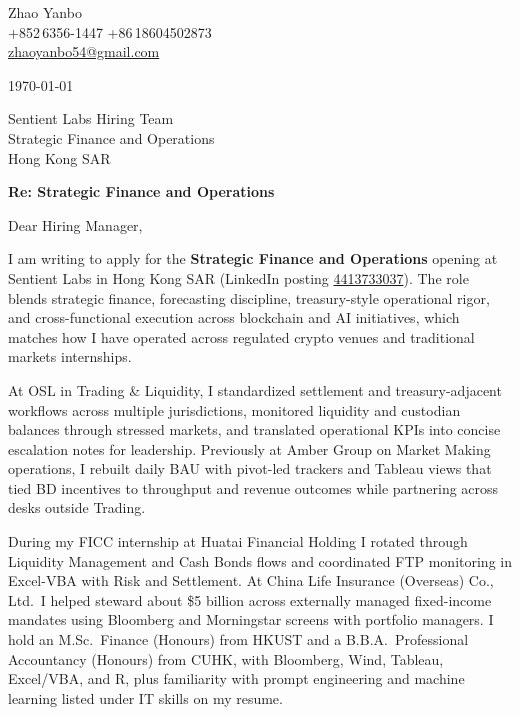 \documentclass[10pt,a4paper]{article}
\begin{document}
\begin{flushleft}
  Zhao Yanbo\\
  +852\,6356-1447 \;\textbar\; +86\,18604502873\\
  \href{mailto:zhaoyanbo54@gmail.com}{zhaoyanbo54@gmail.com}
\end{flushleft}

\vspace{1em}

\begin{flushright}
  \today
\end{flushright}

\vspace{0.75em}

Sentient Labs Hiring Team\\
Strategic Finance and Operations\\
Hong Kong SAR

\vspace{1em}

\textbf{Re: Strategic Finance and Operations}

\vspace{0.75em}

Dear Hiring Manager,

I am writing to apply for the \textbf{Strategic Finance and Operations} opening at Sentient Labs in Hong Kong SAR (LinkedIn posting \href{https://www.linkedin.com/jobs/view/4413733037/}{4413733037}). The role blends strategic finance, forecasting discipline, treasury-style operational rigor, and cross-functional execution across blockchain and AI initiatives, which matches how I have operated across regulated crypto venues and traditional markets internships.

At OSL in Trading \& Liquidity, I standardized settlement and treasury-adjacent workflows across multiple jurisdictions, monitored liquidity and custodian balances through stressed markets, and translated operational KPIs into concise escalation notes for leadership. Previously at Amber Group on Market Making operations, I rebuilt daily BAU with pivot-led trackers and Tableau views that tied BD incentives to throughput and revenue outcomes while partnering across desks outside Trading.

During my FICC internship at Huatai Financial Holding I rotated through Liquidity Management and Cash Bonds flows and coordinated FTP monitoring in Excel-VBA with Risk and Settlement. At China Life Insurance (Overseas) Co., Ltd.\ I helped steward about \$5 billion across externally managed fixed-income mandates using Bloomberg and Morningstar screens with portfolio managers. I hold an M.Sc.\ Finance (Honours) from HKUST and a B.B.A.\ Professional Accountancy (Honours) from CUHK, with Bloomberg, Wind, Tableau, Excel/VBA, and R, plus familiarity with prompt engineering and machine learning listed under IT skills on my resume.
\end{document}
